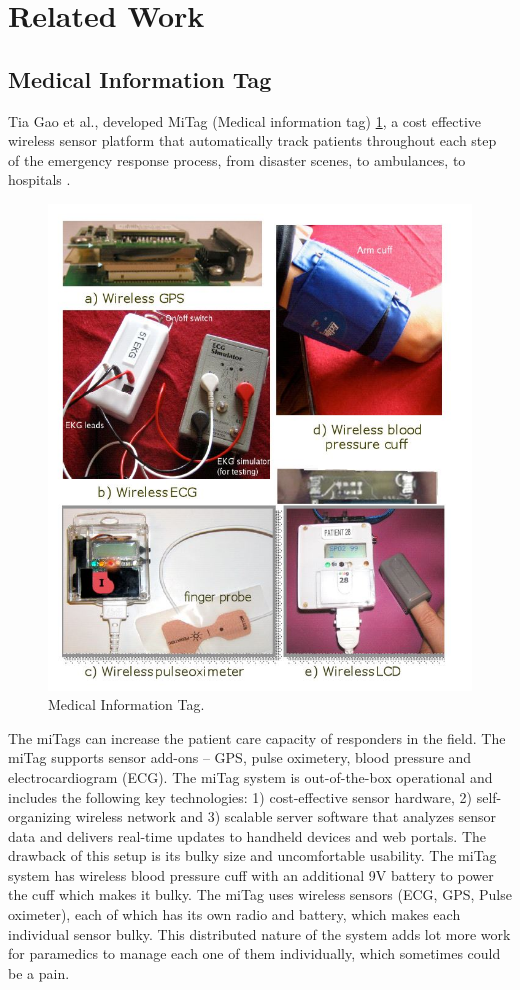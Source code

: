 \section{Related Work}

\subsection{Medical Information Tag}
Tia Gao et al., developed MiTag (Medical information tag) \ref{fig:miTag}, a cost effective 
wireless sensor platform that automatically track patients 
throughout each step of the emergency response process, from disaster scenes, to ambulances, to hospitals \cite{miTag}.
\begin{figure}[h]
	\centering
	\includegraphics[scale = 0.6 ]{miTag.JPG}
	\caption{Medical Information Tag. \cite{miTag}\label{fig:miTag}}
\end{figure}
The miTags can increase 
the patient care capacity of responders in the field. The miTag supports sensor add-ons – GPS, pulse oximetery, blood pressure and electrocardiogram (ECG). 
The miTag system is out-of-the-box operational and includes the following key technologies: 1) cost-effective sensor hardware, 2) 
self-organizing wireless network and 3) scalable server software that analyzes sensor data and delivers real-time updates to handheld devices and web portals. The drawback of this setup is its bulky size and uncomfortable usability. The miTag system has wireless blood pressure cuff with an additional 9V battery to power the cuff which makes it bulky. The miTag uses wireless sensors (ECG, GPS, Pulse oximeter), each of which has its own radio and battery, which makes each individual sensor bulky. This distributed nature of the system adds lot more work for paramedics to manage each one of them individually, which sometimes could be a pain. 

